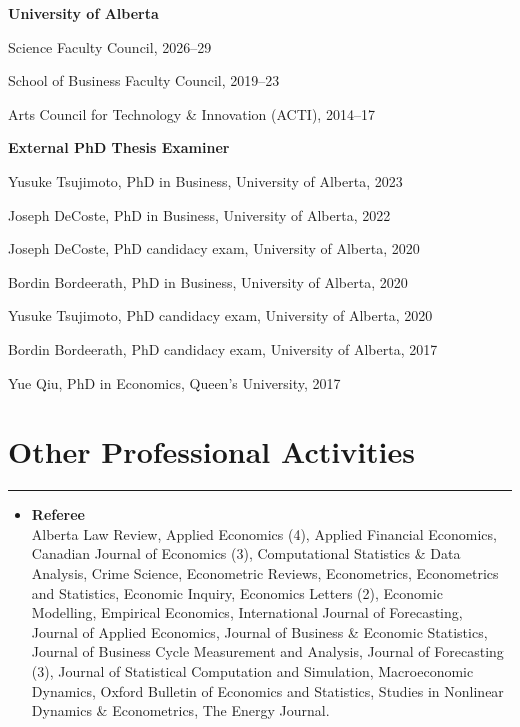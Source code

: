 \documentclass[overlapped,letterpaper,11pt]{res}
\newcommand{\cvrule}{%
  \hspace*{-\sectionwidth}%
  \rule[2mm]{\dimexpr\textwidth+\sectionwidth\relax}{.25pt}}
\newcommand{\cvsection}[1]{%
  \needspace{4\baselineskip}%
  \section{\textbf{#1}}%
  \cvrule}
\newenvironment{list1}{
  \begin{list}{\textendash}{%
      \setlength{\itemsep}{0in}
      \setlength{\parsep}{0in} \setlength{\parskip}{0in}
      \setlength{\topsep}{0in} \setlength{\partopsep}{0in}
      \setlength{\leftmargin}{0.17in}}}{\end{list}
}
\begin{document}
\begin{resume}
\begin{itemize}
\item \textbf{University of Alberta}
	\begin{list1}
	\item[-] Science Faculty Council, 2026--29
	\item[-] School of Business Faculty Council, 2019--23
	\item[-] Arts Council for Technology \& Innovation (ACTI), 2014--17
	\end{list1}

\item \textbf{External PhD Thesis Examiner}
	\begin{list1}
	\item[-] Yusuke Tsujimoto, PhD in Business, University of Alberta, 2023
	\item[-] Joseph DeCoste, PhD in Business, University of Alberta, 2022
	\item[-] Joseph DeCoste, PhD candidacy exam, University of Alberta, 2020
	\item[-] Bordin Bordeerath, PhD in Business, University of Alberta, 2020
	\item[-] Yusuke Tsujimoto, PhD candidacy exam, University of Alberta, 2020
	\item[-] Bordin Bordeerath, PhD candidacy exam, University of Alberta, 2017
	\item[-] Yue Qiu, PhD in Economics, Queen's University, 2017
	\end{list1}

\end{itemize}

\cvsection{Other Professional Activities}
\begin{itemize}

	\item \textbf{Referee} \\
	Alberta Law Review,
	Applied Economics (4),
	Applied Financial Economics,
	Canadian Journal of Economics (3),
	Computational Statistics \& Data Analysis,
	Crime Science,
	Econometric Reviews,
	Econometrics,
	Econometrics and Statistics,
	Economic Inquiry,
	Economics Letters (2),
	Economic Modelling,
	Empirical Economics,
	International Journal of Forecasting,
	Journal of Applied Economics,
	Journal of Business \& Economic Statistics,
	Journal of Business Cycle Measurement and Analysis,
	Journal of Forecasting (3),
	Journal of Statistical Computation and Simulation,
	Macroeconomic Dynamics,
	Oxford Bulletin of Economics and Statistics,
	Studies in Nonlinear Dynamics \& Econometrics,
	The Energy Journal.


\end{itemize}
\end{resume}
\end{document}

